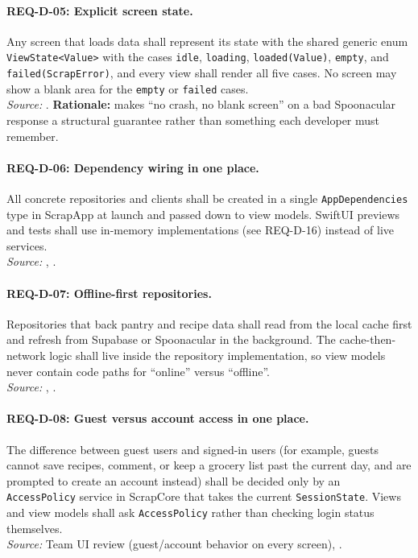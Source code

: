 \paragraph{REQ-D-05: Explicit screen state.}
 Any screen that loads data shall represent its state with the shared generic enum \texttt{ViewState<Value>} with the cases \texttt{idle}, \texttt{loading}, \texttt{loaded(Value)}, \texttt{empty}, and \texttt{failed(ScrapError)}, and every view shall render all five cases. No screen may show a blank area for the \texttt{empty} or \texttt{failed} cases.\\
\textit{Source:} . \textbf{Rationale:} makes ``no crash, no blank screen'' on a bad Spoonacular response a structural guarantee rather than something each developer must remember.

\paragraph{REQ-D-06: Dependency wiring in one place.}
 All concrete repositories and clients shall be created in a single \texttt{AppDependencies} type in ScrapApp at launch and passed down to view models. SwiftUI previews and tests shall use in-memory implementations (see REQ-D-16) instead of live services.\\
\textit{Source:} , .

\paragraph{REQ-D-07: Offline-first repositories.}
 Repositories that back pantry and recipe data shall read from the local cache first and refresh from Supabase or Spoonacular in the background. The cache-then-network logic shall live inside the repository implementation, so view models never contain code paths for ``online'' versus ``offline''.\\
\textit{Source:} , .

\paragraph{REQ-D-08: Guest versus account access in one place.}
 The difference between guest users and signed-in users (for example, guests cannot save recipes, comment, or keep a grocery list past the current day, and are prompted to create an account instead) shall be decided only by an \texttt{AccessPolicy} service in ScrapCore that takes the current \texttt{SessionState}. Views and view models shall ask \texttt{AccessPolicy} rather than checking login status themselves.\\
\textit{Source:} Team UI review (guest/account behavior on every screen), .

